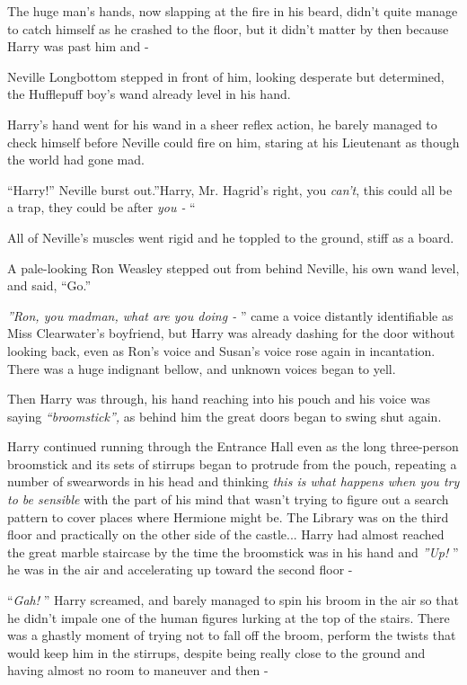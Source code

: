 The huge man's hands, now slapping at the fire in his beard, didn't
quite manage to catch himself as he crashed to the floor, but it didn't
matter by then because Harry was past him and -

Neville Longbottom stepped in front of him, looking desperate but
determined, the Hufflepuff boy's wand already level in his hand.

Harry's hand went for his wand in a sheer reflex action, he barely
managed to check himself before Neville could fire on him, staring at
his Lieutenant as though the world had gone mad.

``Harry!'' Neville burst out.''Harry, Mr. Hagrid's right, you
\emph{can't}, this could all be a trap, they could be after \emph{you -}
``

All of Neville's muscles went rigid and he toppled to the ground, stiff
as a board.

A pale-looking Ron Weasley stepped out from behind Neville, his own wand
level, and said, ``Go.''

\emph{''Ron, you madman, what are you doing -} '' came a voice distantly
identifiable as Miss Clearwater's boyfriend, but Harry was already
dashing for the door without looking back, even as Ron's voice and
Susan's voice rose again in incantation. There was a huge indignant
bellow, and unknown voices began to yell.

Then Harry was through, his hand reaching into his pouch and his voice
was saying \emph{``broomstick'',} as behind him the great doors began to
swing shut again.

Harry continued running through the Entrance Hall even as the long
three-person broomstick and its sets of stirrups began to protrude from
the pouch, repeating a number of swearwords in his head and thinking
\emph{this is what happens when you try to be sensible} with the part of
his mind that wasn't trying to figure out a search pattern to cover
places where Hermione might be. The Library was on the third floor and
practically on the other side of the castle... Harry had almost
reached the great marble staircase by the time the broomstick was in his
hand and \emph{''Up!} '' he was in the air and accelerating up toward the
second floor -

``\emph{Gah!} '' Harry screamed, and barely managed to spin his broom in
the air so that he didn't impale one of the human figures lurking at the
top of the stairs. There was a ghastly moment of trying not to fall off
the broom, perform the twists that would keep him in the stirrups,
despite being really close to the ground and having almost no room to
maneuver and then -

